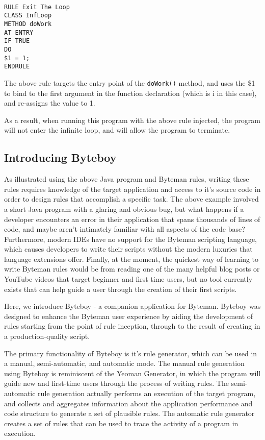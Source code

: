 \documentclass[letterpaper,twocolumn,10pt]{article}
\begin{document}
{\tt \small
\begin{verbatim}
RULE Exit The Loop 
CLASS InfLoop
METHOD doWork
AT ENTRY
IF TRUE
DO
$1 = 1;
ENDRULE
\end{verbatim}
}

The above rule targets the entry point of the {\tt doWork()} method, and uses the \$1 to bind to the first argument in the function declaration (which is i in this case), and re-assigns the value to 1. 

As a result, when running this program with the above rule injected, the program will not enter the infinite loop, and will allow the program to terminate.

\subsection{Introducing Byteboy}

As illustrated using the above Java program and Byteman rules, writing these rules requires knowledge of the target application and access to it's source code in order to design rules that accomplish a specific task. The above example involved a short Java program with a glaring and obvious bug, but what happens if a developer encounters an error in their application that spans thousands of lines of code, and maybe aren't intimately familiar with all aspects of the code base? Furthermore, modern IDEs have no support for the Byteman scripting language, which causes developers to write their scripts without the modern luxuries that language extensions offer. Finally, at the moment, the quickest way of learning to write Byteman rules would be from reading one of the many helpful blog posts\cite{bytemanblog} or YouTube videos\cite{bytemanvideo} that target beginner and first time users, but no tool currently exists that can help guide a user through the creation of their first scripts.

Here, we introduce Byteboy - a companion application for Byteman. Byteboy was designed to enhance the Byteman user experience by aiding the development of rules starting from the point of rule inception, through to the result of creating in a production-quality script. 

The primary functionality of Byteboy is it's rule generator, which can be used in a manual, semi-automatic, and automatic mode. The manual rule generation using Byteboy is reminiscent of the Yeoman Generator\cite{yoman}, in which the program will guide new and first-time users through the process of writing rules. The semi-automatic rule generation actually performs an execution of the target program, and collects and aggregates information about the application performance and code structure to generate a set of plausible rules. The automatic rule generator creates a set of rules that can be used to trace the activity of a program in execution.   
\end{document}
